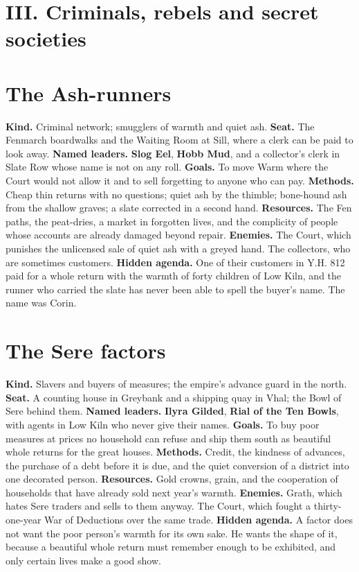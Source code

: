 \documentclass{design/chronicle}
\begin{document}
\CRrule

\section*{III. Criminals, rebels and secret societies}

\section*{The Ash-runners}

\textbf{Kind.} Criminal network; smugglers of warmth and quiet ash. \textbf{Seat.} The Fenmarch boardwalks and the Waiting Room at Sill, where a clerk can be paid to look away. \textbf{Named leaders.} \textbf{Slog Eel}, \textbf{Hobb Mud}, and a collector’s clerk in Slate Row whose name is not on any roll. \textbf{Goals.} To move Warm where the Court would not allow it and to sell forgetting to anyone who can pay. \textbf{Methods.} Cheap thin returns with no questions; quiet ash by the thimble; bone-hound ash from the shallow graves; a slate corrected in a second hand. \textbf{Resources.} The Fen paths, the peat-dries, a market in forgotten lives, and the complicity of people whose accounts are already damaged beyond repair. \textbf{Enemies.} The Court, which punishes the unlicensed sale of quiet ash with a greyed hand. The collectors, who are sometimes customers. \textbf{Hidden agenda.} One of their customers in Y.H. 812 paid for a whole return with the warmth of forty children of Low Kiln, and the runner who carried the slate has never been able to spell the buyer’s name. The name was Corin.

\section*{The Sere factors}

\textbf{Kind.} Slavers and buyers of measures; the empire’s advance guard in the north. \textbf{Seat.} A counting house in Greybank and a shipping quay in Vhal; the Bowl of Sere behind them. \textbf{Named leaders.} \textbf{Ilyra Gilded}, \textbf{Rial of the Ten Bowls}, with agents in Low Kiln who never give their names. \textbf{Goals.} To buy poor measures at prices no household can refuse and ship them south as beautiful whole returns for the great houses. \textbf{Methods.} Credit, the kindness of advances, the purchase of a debt before it is due, and the quiet conversion of a district into one decorated person. \textbf{Resources.} Gold crowns, grain, and the cooperation of households that have already sold next year’s warmth. \textbf{Enemies.} Grath, which hates Sere traders and sells to them anyway. The Court, which fought a thirty-one-year War of Deductions over the same trade. \textbf{Hidden agenda.} A factor does not want the poor person’s warmth for its own sake. He wants the shape of it, because a beautiful whole return must remember enough to be exhibited, and only certain lives make a good show.
\end{document}
